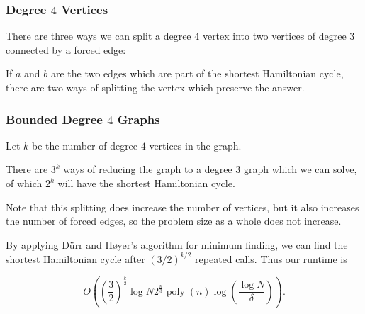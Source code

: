 \documentclass[]{beamer}
\DeclareMathOperator{\poly}{poly}
\begin{document}
\begin{frame}
\frametitle{Degree $4$ Vertices}

There are three ways we can split a degree $4$ vertex into two vertices of degree $3$ connected by a forced edge:

\begin{center}
\end{center}

If $a$ and $b$ are the two edges which are part of the shortest Hamiltonian cycle, there are two ways of splitting the vertex which preserve the answer.
\end{frame}

\begin{frame}
\frametitle{Bounded Degree $4$ Graphs}
Let $k$ be the number of degree $4$ vertices in the graph.

There are $3^k$ ways of reducing the graph to a degree $3$ graph which we can solve, of which $2^k$ will have the shortest Hamiltonian cycle.

Note that this splitting does increase the number of vertices, but it also increases the number of forced edges, so the problem size as a whole does not increase.

By applying D\"urr and H\o yer's algorithm for minimum finding, we can find the shortest Hamiltonian cycle after $(3/2)^{k/2}$ repeated calls. Thus our runtime is

$$O\left(\left(\frac{3}{2}\right)^{\frac{k}{2}}\log N2^{\frac{n}{3}}\poly(n)\log\left(\frac{\log N}{\delta}\right)\right).$$
\end{frame}
\end{document}
